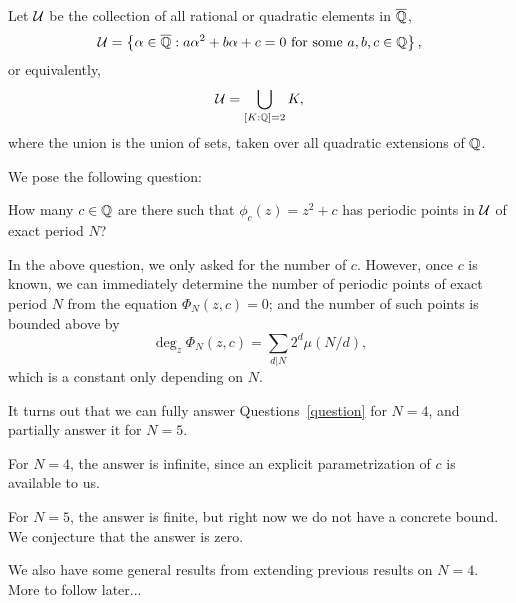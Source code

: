 Let $\mathcal{U}$ be the collection of all rational or quadratic elements in
$\overline{\mathbb{Q}}$,
\[
\mathcal{U} = \left\{\alpha \in \overline{\mathbb{Q}}: \text{$a \alpha^2 + b \alpha + c = 0$
    for some $a, b, c \in \mathbb{Q}$}\right\},
\]
or equivalently,
\[
\mathcal{U} = \bigcup_{[K : \mathbb{Q}] = 2}K,
\]
where the union is the union of sets, taken over all quadratic
extensions of $\mathbb{Q}$.

We pose the following question:

\begin{question}
  \label{question}
  How many $c \in \mathbb{Q}$ are there such that $\phi_c(z) = z^2 + c$ has
  periodic points in $\mathcal{U}$ of exact period $N$?
\end{question}

\begin{remark}
  In the above question, we only asked for the number of $c$. However,
  once $c$ is known, we can immediately determine the number of
	periodic points of exact period $N$ from the equation $\Phi_N(z, c)
	= 0$; and the number of such points is bounded above by
  \[
  \deg_z \Phi_N(z, c) = \sum_{d|N}2^d \mu(N/d),
  \]
  which is a constant only depending on $N$.
\end{remark}

It turns out that we can fully answer Questions~\ref{question} for
$N = 4$, and partially answer it for $N = 5$.

For $N = 4$, the answer is infinite, since an explicit parametrization
of $c$ is available to us.

For $N = 5$, the answer is finite, but right now we do not have a 
concrete bound. We conjecture that the answer is zero.

We also have some general results from extending previous results on
$N = 4$. More to follow later...

